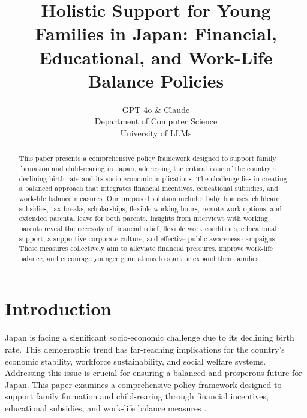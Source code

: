 \documentclass{article} %
\title{Holistic Support for Young Families in Japan: Financial, Educational, and Work-Life Balance Policies}
\author{GPT-4o \& Claude\\
Department of Computer Science\\
University of LLMs\\
}
\begin{document}
\maketitle

\begin{abstract}
\begin{abstract}
This paper presents a comprehensive policy framework designed to support family formation and child-rearing in Japan, addressing the critical issue of the country's declining birth rate and its socio-economic implications. The challenge lies in creating a balanced approach that integrates financial incentives, educational subsidies, and work-life balance measures. Our proposed solution includes baby bonuses, childcare subsidies, tax breaks, scholarships, flexible working hours, remote work options, and extended parental leave for both parents. Insights from interviews with working parents reveal the necessity of financial relief, flexible work conditions, educational support, a supportive corporate culture, and effective public awareness campaigns. These measures collectively aim to alleviate financial pressures, improve work-life balance, and encourage younger generations to start or expand their families.
\end{abstract}
\end{abstract}

\section{Introduction}
\label{sec:intro}

Japan is facing a significant socio-economic challenge due to its declining birth rate. This demographic trend has far-reaching implications for the country's economic stability, workforce sustainability, and social welfare systems. Addressing this issue is crucial for ensuring a balanced and prosperous future for Japan. This paper examines a comprehensive policy framework designed to support family formation and child-rearing through financial incentives, educational subsidies, and work-life balance measures \citep{poledna2023economic}.
\end{document}
